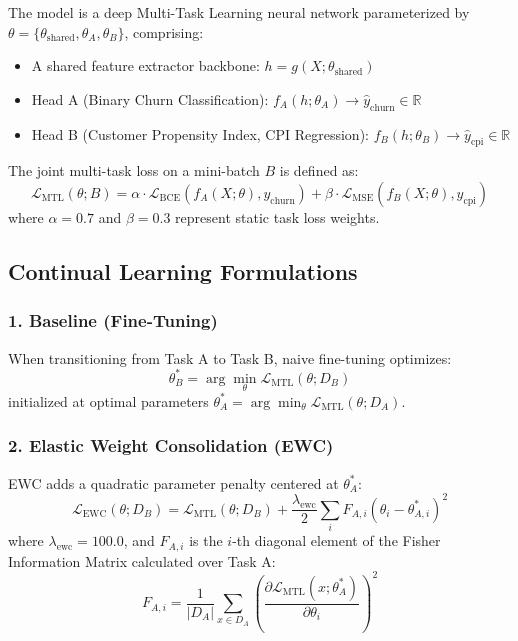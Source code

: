 \documentclass{article}
\begin{document}
The model is a deep Multi-Task Learning neural network parameterized by $\theta = \{\theta_{\text{shared}}, \theta_A, \theta_B\}$, comprising:
\begin{itemize}
    \item A shared feature extractor backbone: $h = g(X; \theta_{\text{shared}})$
    \item Head A (Binary Churn Classification): $f_A(h; \theta_A) \to \hat{y}_{\text{churn}} \in \mathbb{R}$
    \item Head B (Customer Propensity Index, CPI Regression): $f_B(h; \theta_B) \to \hat{y}_{\text{cpi}} \in \mathbb{R}$
\end{itemize}

The joint multi-task loss on a mini-batch $B$ is defined as:
\begin{equation}
\mathcal{L}_{\text{MTL}}(\theta; B) = \alpha \cdot \mathcal{L}_{\text{BCE}}\left(f_A(X; \theta), y_{\text{churn}}\right) + \beta \cdot \mathcal{L}_{\text{MSE}}\left(f_B(X; \theta), y_{\text{cpi}}\right)
\end{equation}
where $\alpha = 0.7$ and $\beta = 0.3$ represent static task loss weights.

\subsection{Continual Learning Formulations}

\subsubsection{1. Baseline (Fine-Tuning)}
When transitioning from Task A to Task B, naive fine-tuning optimizes:
\begin{equation}
\theta_B^* = \arg\min_{\theta} \mathcal{L}_{\text{MTL}}(\theta; D_B)
\end{equation}
initialized at optimal parameters $\theta_A^* = \arg\min_{\theta} \mathcal{L}_{\text{MTL}}(\theta; D_A)$.

\subsubsection{2. Elastic Weight Consolidation (EWC)}
EWC adds a quadratic parameter penalty centered at $\theta_A^*$:
\begin{equation}
\mathcal{L}_{\text{EWC}}(\theta; D_B) = \mathcal{L}_{\text{MTL}}(\theta; D_B) + \frac{\lambda_{\text{ewc}}}{2} \sum_{i} F_{A,i} (\theta_i - \theta_{A,i}^*)^2
\end{equation}
where $\lambda_{\text{ewc}} = 100.0$, and $F_{A,i}$ is the $i$-th diagonal element of the Fisher Information Matrix calculated over Task A:
\begin{equation}
F_{A,i} = \frac{1}{|D_A|} \sum_{x \in D_A} \left( \frac{\partial \mathcal{L}_{\text{MTL}}(x; \theta_A^*)}{\partial \theta_i} \right)^2
\end{equation}
\end{document}
